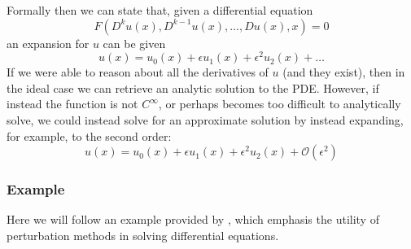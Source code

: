 \noindent
Formally then we can state that, given a differential equation
$$F(D^{k} u(x), D^{k-1}u(x), \dots, Du(x), x) = 0$$
an expansion for $u$ can be given
$$u(x) = u_0(x) + \epsilon u_1(x) + \epsilon^2 u_2(x) + \dots$$
If we were able to reason about all the derivatives of $u$ (and they exist), then in the ideal case we 
can retrieve an analytic solution to the PDE. However, if instead the function is not $C^{\infty}$, or perhaps 
becomes too difficult to analytically solve, we could instead solve for an approximate solution by instead expanding, for 
example, to the second order:
$$u(x) = u_0(x) + \epsilon u_1(x) + \epsilon^2 u_2(x) + \mathcal{O}(\epsilon^2)$$

\subsubsection{Example}
Here we will follow an example provided by \cite{perturbation-example}, which emphasis the utility of perturbation methods in solving 
differential equations. 

